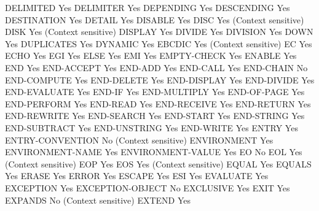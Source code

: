 DELIMITED                       Yes
DELIMITER                       Yes
DEPENDING                       Yes
DESCENDING                      Yes
DESTINATION                     Yes
DETAIL                          Yes
DISABLE                         Yes
DISC                            Yes (Context sensitive)
DISK                            Yes (Context sensitive)
DISPLAY                         Yes
DIVIDE                          Yes
DIVISION                        Yes
DOWN                            Yes
DUPLICATES                      Yes
DYNAMIC                         Yes
EBCDIC                          Yes (Context sensitive)
EC                              Yes
ECHO                            Yes
EGI                             Yes
ELSE                            Yes
EMI                             Yes
EMPTY-CHECK                     Yes
ENABLE                          Yes
END                             Yes
END-ACCEPT                      Yes
END-ADD                         Yes
END-CALL                        Yes
END-CHAIN                       No
END-COMPUTE                     Yes
END-DELETE                      Yes
END-DISPLAY                     Yes
END-DIVIDE                      Yes
END-EVALUATE                    Yes
END-IF                          Yes
END-MULTIPLY                    Yes
END-OF-PAGE                     Yes
END-PERFORM                     Yes
END-READ                        Yes
END-RECEIVE                     Yes
END-RETURN                      Yes
END-REWRITE                     Yes
END-SEARCH                      Yes
END-START                       Yes
END-STRING                      Yes
END-SUBTRACT                    Yes
END-UNSTRING                    Yes
END-WRITE                       Yes
ENTRY                           Yes
ENTRY-CONVENTION                No (Context sensitive)
ENVIRONMENT                     Yes
ENVIRONMENT-NAME                Yes
ENVIRONMENT-VALUE               Yes
EO                              No
EOL                             Yes (Context sensitive)
EOP                             Yes
EOS                             Yes (Context sensitive)
EQUAL                           Yes
EQUALS                          Yes
ERASE                           Yes
ERROR                           Yes
ESCAPE                          Yes
ESI                             Yes
EVALUATE                        Yes
EXCEPTION                       Yes
EXCEPTION-OBJECT                No
EXCLUSIVE                       Yes
EXIT                            Yes
EXPANDS                         No (Context sensitive)
EXTEND                          Yes
